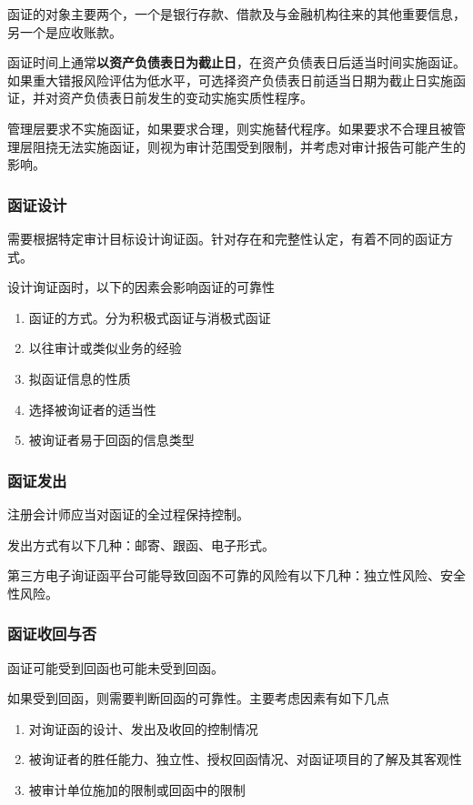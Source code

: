 \documentclass[UTF8,12pt]{ctexart}
\numberwithin{equation}{section} %
\numberwithin{figure}{section}
\numberwithin{table}{section}
\begin{document}
	函证的对象主要两个，一个是银行存款、借款及与金融机构往来的其他重要信息，另一个是应收账款。
	
	函证时间上通常\textbf{以资产负债表日为截止日}，在资产负债表日后适当时间实施函证。如果重大错报风险评估为低水平，可选择资产负债表日前适当日期为截止日实施函证，并对资产负债表日前发生的变动实施实质性程序。
	
	管理层要求不实施函证，如果要求合理，则实施替代程序。如果要求不合理且被管理层阻挠无法实施函证，则视为审计范围受到限制，并考虑对审计报告可能产生的影响。
	
	\subsubsection{函证设计}
	需要根据特定审计目标设计询证函。针对存在和完整性认定，有着不同的函证方式。
	
	设计询证函时，以下的因素会影响函证的可靠性
	\begin{enumerate}
		\item 函证的方式。分为积极式函证与消极式函证
		
		\item 以往审计或类似业务的经验
		
		\item 拟函证信息的性质
		
		\item 选择被询证者的适当性
		
		\item 被询证者易于回函的信息类型
	\end{enumerate}
	
	\subsubsection{函证发出}
	注册会计师应当对函证的全过程保持控制。
	
	发出方式有以下几种：邮寄、跟函、电子形式。
	
	第三方电子询证函平台可能导致回函不可靠的风险有以下几种：独立性风险、安全性风险。
	
	\subsubsection{函证收回与否}
	函证可能受到回函也可能未受到回函。
	
	如果受到回函，则需要判断回函的可靠性。主要考虑因素有如下几点
	\begin{enumerate}
		\item 对询证函的设计、发出及收回的控制情况
		
		\item 被询证者的胜任能力、独立性、授权回函情况、对函证项目的了解及其客观性
		
		\item 被审计单位施加的限制或回函中的限制
	\end{enumerate}
	
\end{document}
